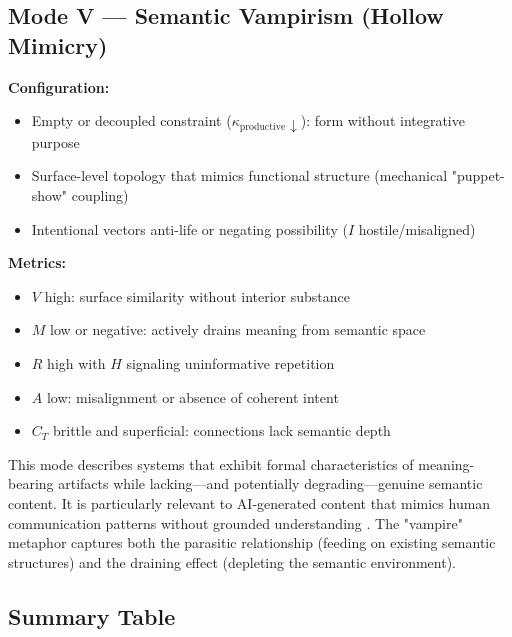 \documentclass[12pt]{article}
\begin{document}
\subsection{Mode V — Semantic Vampirism (Hollow Mimicry)}

\textbf{Configuration:}
\begin{itemize}
\item Empty or decoupled constraint ($\kappa_{\text{productive}} \downarrow$): form without integrative purpose
\item Surface-level topology that mimics functional structure (mechanical "puppet-show" coupling)
\item Intentional vectors anti-life or negating possibility ($I$ hostile/misaligned)
\end{itemize}

\textbf{Metrics:}
\begin{itemize}
\item $V$ high: surface similarity without interior substance
\item $M$ low or negative: actively drains meaning from semantic space
\item $R$ high with $H$ signaling uninformative repetition
\item $A$ low: misalignment or absence of coherent intent
\item $C_T$ brittle and superficial: connections lack semantic depth
\end{itemize}

This mode describes systems that exhibit formal characteristics of meaning-bearing artifacts while lacking—and potentially degrading—genuine semantic content. It is particularly relevant to AI-generated content that mimics human communication patterns without grounded understanding \citep{bender2020climbing}. The "vampire" metaphor captures both the parasitic relationship (feeding on existing semantic structures) and the draining effect (depleting the semantic environment).

\subsection{Summary Table}
\end{document}
